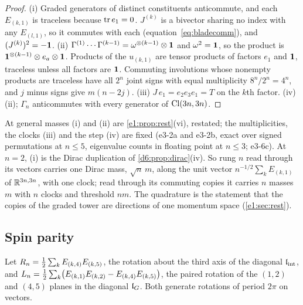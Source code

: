 \begin{proof}
(i) Graded generators of distinct constituents anticommute, and each $E_{(k,1)}$ is traceless because $\operatorname{tr} e_1=0$. $J^{(k)}$ is a bivector sharing no
index with any $E_{(l,1)}$, so it commutes with each (equation~\cref{eq:bladecomm}), and $(J^{(k)})^2=-\mathbf 1$. (ii) $\Gamma^{(1)}\cdots\Gamma^{(k-1)}=\omega^{\otimes(k-1)}\otimes\mathbf 1$ and $\omega^2=\mathbf 1$, so the
product is $\mathbf 1^{\otimes(k-1)}\otimes e_a\otimes\mathbf 1$. Products of the $u_{(k,1)}$ are tensor products of factors $e_1$ and $\mathbf 1$, traceless unless all
factors are $\mathbf 1$. Commuting involutions whose nonempty products are traceless have all $2^n$ joint signs with equal multiplicity $8^n/2^n=4^n$, and $j$ minus signs give
$m(n-2j)$. (iii) $J\,e_1=e_2e_3e_1=T$ on the $k$th factor. (iv) (ii); $\Gamma_n$ anticommutes with every generator of $\mathrm{Cl}(3n,3n)$.
\end{proof}

At general masses (i) and (ii) are \cref{e1:prop:rest}(vi), restated; the multiplicities, the clocks (iii) and the step (iv) are fixed
(e3-2a and e3-2b, exact over signed permutations at $n\le5$, eigenvalue counts in floating point at $n\le3$; e3-6c). At $n=2$, (i) is the
Dirac duplication of \cref{d6:prop:dirac}(iv). So rung $n$ read through its vectors carries one Dirac mass, $\sqrt n\,m$, along the unit
vector $n^{-1/2}\sum_kE_{(k,1)}$ of $\mathbb{R}^{3n,3n}$, with one clock; read through its commuting copies it carries $n$ masses $m$ with $n$ clocks and
threshold $nm$. The quadrature is the statement that the copies of the graded tower are directions of one momentum space (\cref{e1:sec:rest}).

\subsection{Spin parity}
\label{e3:sec:spin}

Let $R_n=\tfrac12\sum_kE_{(k,4)}E_{(k,5)}$, the rotation about the third axis of the diagonal $\mathfrak l_{\rm int}$, and
$L_n=\tfrac12\sum_k\bigl(E_{(k,1)}E_{(k,2)}-E_{(k,4)}E_{(k,5)}\bigr)$, the paired rotation of the $(1,2)$ and $(4,5)$ planes in the diagonal $\mathfrak l_G$. Both
generate rotations of period $2\pi$ on vectors.

